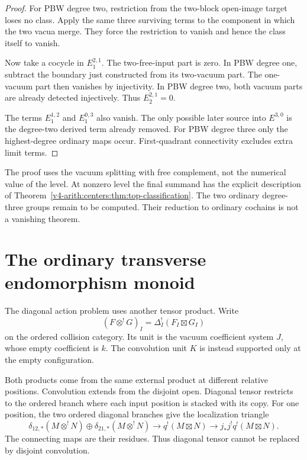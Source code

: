 \begin{proof}
For PBW degree
two, restriction
from the two-block
open-image target
loses no class.
Apply the same
three surviving
terms to the
component in
which the two
vacua merge.
They force the
restriction to
vanish and hence
the class itself
to vanish.

Now take a
cocycle in
$E_1^{2,1}$.
The two-free-input
part is zero.
In PBW degree
one, subtract
the boundary
just constructed
from its two-vacuum
part. The
one-vacuum part
then vanishes
by injectivity.
In PBW degree
two, both
vacuum parts
are already
detected injectively.
Thus
$E_2^{2,1}=0$.

The terms
$E_1^{1,2}$
and
$E_1^{0,3}$
also vanish.
The only possible
later source
into $E^{3,0}$
is the degree-two
derived term
already removed.
For PBW degree
three only the
highest-degree
ordinary maps
occur.
First-quadrant
connectivity
excludes extra
limit terms.
\end{proof}

The proof uses
the vacuum splitting
with free complement,
not the numerical
value of the
level. At nonzero
level the final
summand has the
explicit description
of
Theorem~\ref{v4-arith:centers:thm:top-classification}.
The two ordinary
degree-three groups
remain to be
computed. Their
reduction to
ordinary cochains
is not a
vanishing theorem.

\section{The ordinary transverse endomorphism monoid}
\label{v4-arith:centers:sec:transverse}

The diagonal action problem uses another
tensor product. Write
\[
 (F\otimes^!G)_I=\Delta_I^!(F_I\boxtimes G_I)
\]
on the ordered collision category.
Its unit is the vacuum coefficient
system $J$, whose empty coefficient
is $k$. The convolution unit $K$
is instead supported only at the
empty configuration.

Both products come from the same
external product at different
relative positions. Convolution
extends from the disjoint open.
Diagonal tensor restricts to the
ordered branch where each input
position is stacked with its copy.
For one position, the two ordered
diagonal branches give the
localization triangle
\[
 \delta_{12,*}(M\otimes^!N)
 \oplus\delta_{21,*}(M\otimes^!N)
 \longrightarrow q^!(M\boxtimes N)
 \longrightarrow j_*j^!q^!(M\boxtimes N).
\]
The connecting maps are their
residues. Thus diagonal tensor
cannot be replaced by disjoint
convolution.

